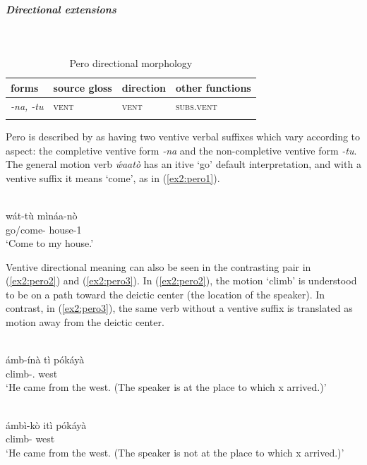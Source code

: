 \subparagraph{Directional extensions}~



\begin{table}[H]
	\caption{Pero directional morphology}
	\label{tab:pero}
	\begin{tabular}{llll} %
		\lsptoprule
		forms & source gloss & direction  & other functions \\ %
		\midrule
		\textit{-na, -tu}  &  \textsc{vent}  &  \textsc{vent} &  \textsc{subs.vent}  \\
		\lspbottomrule
	\end{tabular}
\end{table} 

Pero is described by \citet[95]{frajzyngierGrammarPero1989} as having two ventive verbal suffixes which vary according to aspect: the completive ventive form \textit{-na} and the non-completive ventive form \textit{-tu}. The general motion verb \textit{ẃaatò} has an itive `go' default interpretation, and with a ventive suffix it means `come', as in (\ref{ex2:pero1}). 

\ea\label{ex2:pero1}
 \\
\gll  wát-tù	mìnáa-nò	 \\
go/come-	house-1	 \\
\glt `Come to my house.'
\z

Ventive directional meaning can also be seen in the contrasting pair in (\ref{ex2:pero2}) and (\ref{ex2:pero3}). In (\ref{ex2:pero2}), the motion ‘climb’ is understood to be on a path toward the deictic center (the location of the speaker). In contrast, in (\ref{ex2:pero3}), the same verb without a ventive suffix is translated as motion away from the deictic center. 

\ea\label{ex2:pero2}
 \\
\gll  ámb-ínà	tì	pókáyà \\
climb-.		west \\
\glt `He came from the west. (The speaker is at the place to which x arrived.)'

\ex\label{ex2:pero3}
 \\
\gll  ámbì-kò	itì	pókáyà \\
climb-		west \\
\glt `He came from the west. (The speaker is not at the place to which x arrived.)'
\z 

